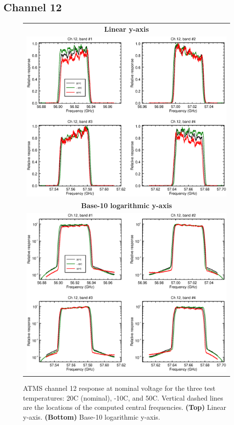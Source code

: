\subsection{Channel 12}
\begin{figure}[H]
  \label{fig:Tset.ch12_response}
  \centering
  \begin{tabular}{c}
    \hspace{0.75cm}\sffamily\textbf{Linear y-axis} \\
    \includegraphics[scale=0.55]{graphics/srf/Tset/lin/atms_npp-12.eps} \\
    \hspace{0.75cm}\sffamily\textbf{Base-10 logarithmic y-axis} \\
    \includegraphics[scale=0.55]{graphics/srf/Tset/log/atms_npp-12.eps}
  \end{tabular}
  \caption{ATMS channel 12 response at nominal voltage for the three test temperatures: 20\textdegree{}C (nominal), -10\textdegree{}C, and 50\textdegree{}C. Vertical dashed lines are the locations of the computed central frequencies. \textbf{(Top)} Linear y-axis. \textbf{(Bottom)} Base-10 logarithmic y-axis.}
\end{figure}

